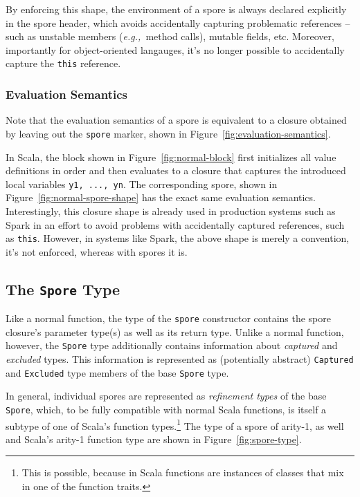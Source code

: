\documentclass{llncs}
\newcommand{\eg}{{\em e.g.,~}}
\begin{document}
By enforcing this shape, the environment of a spore is always declared
explicitly in the spore header, which avoids accidentally capturing
problematic references -- such as unstable members (\eg method calls), mutable
fields, etc. Moreover, importantly for object-oriented langauges, it's no
longer possible to accidentally capture the \verb|this| reference.

\subsubsection{Evaluation Semantics}

Note that the evaluation semantics of a spore is equivalent to a closure
obtained by leaving out the \verb|spore| marker, shown in
Figure~\ref{fig:evaluation-semantics}.

In Scala, the block shown in Figure~\ref{fig:normal-block} first initializes
all value definitions in order and then evaluates to a closure that captures
the introduced local variables \verb|y1, ..., yn|. The corresponding spore,
shown in Figure~\ref{fig:normal-spore-shape} has the exact same evaluation
semantics. Interestingly, this closure shape is already used in production
systems such as Spark in an effort to avoid problems with accidentally
captured references, such as \verb|this|. However, in systems like Spark, the
above shape is merely a convention, it's not enforced, whereas with spores it
is.

\vspace{2mm}
\subsection{The \texttt{Spore} Type}
\label{sec:spore-type}
\vspace{1mm}

Like a normal function, the type of the \verb|spore| constructor contains the
spore closure's parameter type(s) as well as its return type. Unlike a normal function,
however, the \verb|Spore| type additionally contains information about
\textit{captured} and \textit{excluded} types. This information is represented
as (potentially abstract) \verb|Captured| and \verb|Excluded| type members of
the base \verb|Spore| type.

In general, individual spores are represented as {\em refinement types} of the
base \verb|Spore|, which, to be fully compatible with normal Scala functions,
is itself a subtype of one of Scala's function types.\footnote{This is possible, because in Scala functions are instances of classes that mix in one of the function traits.}
The type of a spore of arity-1, as well and Scala's arity-1 function type are
shown in Figure~\ref{fig:spore-type}.
\end{document}
